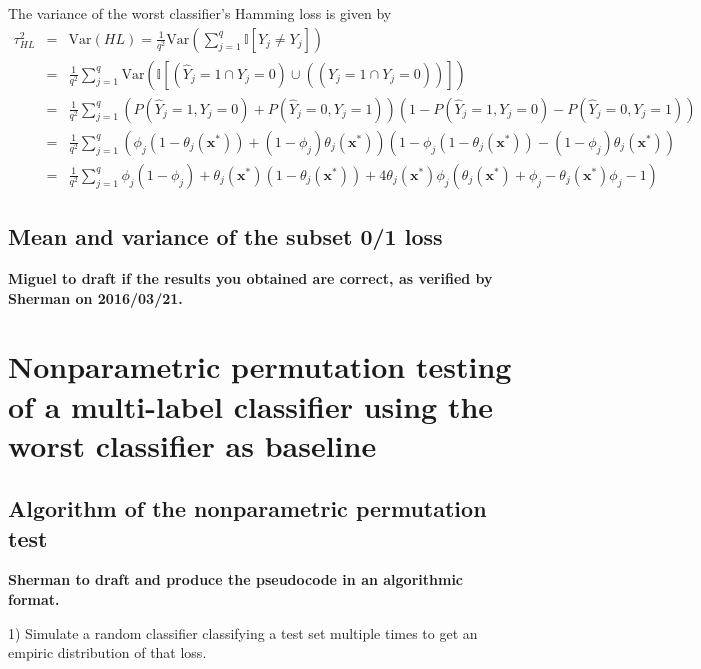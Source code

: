 \documentclass[review]{elsarticle}
\begin{document}
The variance of the worst classifier's Hamming loss is given by
\begin{eqnarray*}
\tau^{2}_{HL} &=& \mathrm{Var}(HL) = \frac{1}{q^{2}} \mathrm{Var} \left( \sum^{q}_{j=1}{\mathbb{I} [\hat{Y}_{j} \neq Y_{j}]} \right) \\
&=& \frac{1}{q^{2}} \sum^{q}_{j=1}{\mathrm{Var} \left( \mathbb{I} [(\hat{Y}_{j} = 1 \cap Y_{j} = 0) \cup ((\hat{Y}_{j} = 1 \cap Y_{j} = 0)) ] \right)} \\
&=& \frac{1}{q^{2}} \sum^{q}_{j=1}{\left( P(\hat{Y}_{j}=1,Y_{j}=0) + P(\hat{Y}_{j}=0,Y_{j}=1) \right) \left(1 - P(\hat{Y}_{j}=1,Y_{j}=0) - P(\hat{Y}_{j}=0,Y_{j}=1) \right)} \\
&=& \frac{1}{q^{2}} \sum^{q}_{j=1}{\left(\phi_{j} (1 - \theta_{j}(\mathbf{x}^{*})) + (1 - \phi_{j})\theta_{j}(\mathbf{x^{*}}) \right) \left( 1 - \phi_{j} (1 - \theta_{j}(\mathbf{x}^{*})) - (1 - \phi_{j})\theta_{j}(\mathbf{x}^{*}) \right)} \\
&=& \frac{1}{q^{2}} \sum^{q}_{j=1}{\phi_{j} (1 - \phi_{j})} + \theta_{j}(\mathbf{x}^{*})(1 - \theta_{j}(\mathbf{x}^{*})) + 4\theta_{j}(\mathbf{x}^{*}) \phi_{j} \left( \theta_{j}(\mathbf{x}^{*}) + \phi_{j} - \theta_{j}(\mathbf{x}^{*}) \phi_{j} - 1 \right)
\end{eqnarray*}


\subsection{Mean and variance of the subset 0/1 loss}\label{ss:01}

{\bf Miguel to draft if the results you obtained are correct, as verified by Sherman on 2016/03/21.}



\section{Nonparametric permutation testing of a multi-label classifier using the worst classifier as baseline}\label{s:testing}

\subsection{Algorithm of the nonparametric permutation test}\label{ss:algorithm}

{\bf Sherman to draft and produce the pseudocode in an algorithmic format.}

1) Simulate a random classifier classifying a test set multiple times to get an empiric distribution of that loss.
\end{document}
